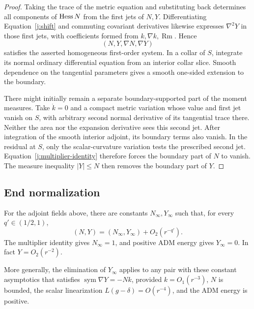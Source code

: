\begin{proof}
Taking the trace of the metric equation and substituting back determines
all components of \(\operatorname{Hess} N\) from the first jets of \(N,Y\).
Differentiating Equation~\eqref{j:shift} and commuting covariant derivatives
likewise expresses \(\nabla^2Y\) in those first jets, with coefficients
formed from \(k,\nabla k,\operatorname{Rm}\). Hence
\[
 (N,Y,\nabla N,\nabla Y)
\]
satisfies the asserted homogeneous first-order system. In a collar of
\(S\), integrate its normal ordinary differential equation from an
interior collar slice. Smooth dependence on the tangential parameters
gives a smooth one-sided extension to the boundary.

There might initially remain a separate boundary-supported part of the
moment measures. Take \(\dot k=0\) and a compact metric variation whose
value and first jet vanish on \(S\), with arbitrary second normal
derivative of its tangential trace there. Neither the area nor the
expansion derivative sees this second jet. After integration of the
smooth interior adjoint, its boundary terms also vanish. In the residual
at \(S\), only the scalar-curvature variation tests the prescribed
second jet. Equation~\eqref{j:multiplier-identity} therefore forces the
boundary part of \(N\) to vanish. The measure inequality \(|Y|\leq N\)
then removes the boundary part of \(Y\).
\end{proof}

\subsection{End normalization}
\label{j:end-section}

\begin{lemma}
\label{j:end}
For the adjoint fields above, there are constants \(N_\infty,Y_\infty\)
such that, for every \(q'\in(1/2,1)\),
\[
 (N,Y)=(N_\infty,Y_\infty)+O_2(r^{-q'}).
\]
The multiplier identity gives \(N_\infty=1\), and positive ADM energy
gives \(Y_\infty=0\). In fact \(Y=O_2(r^{-2})\).

More generally, the elimination of \(Y_\infty\) applies to any pair
with these constant asymptotics that satisfies
\(\operatorname{sym}\nabla Y=-Nk\), provided
\(k=O_1(r^{-3})\), \(N\) is bounded, the scalar linearization
\(L(g-\delta)=O(r^{-4})\), and the ADM energy is positive.
\end{lemma}

